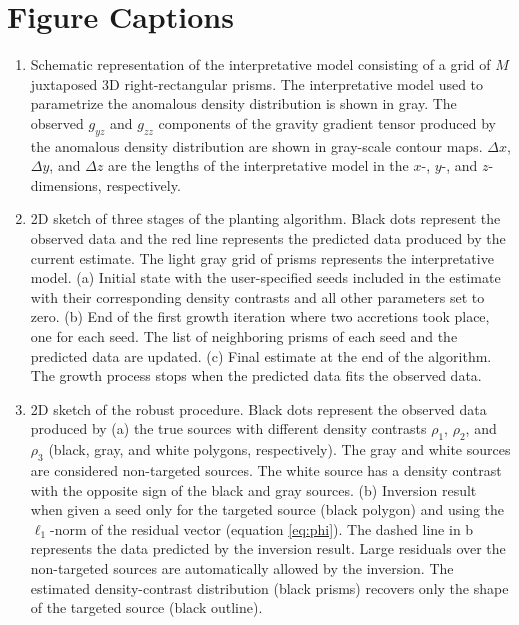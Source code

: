 \newpage
\section{Figure Captions}


\begin{enumerate}

\item \label{fig:interpmodel}
    Schematic representation of the interpretative model
    consisting of a grid of $M$ juxtaposed 3D right-rectangular prisms.
    The interpretative model used to
    parametrize the anomalous density distribution
    is shown in gray.
    The observed $g_{yz}$ and $g_{zz}$ components of
    the gravity gradient tensor produced by
    the anomalous density distribution
    are shown in gray-scale contour maps.
    $\Delta x$, $\Delta y$, and $\Delta z$ are
    the lengths of the interpretative model
    in the $x$-, $y$-, and $z$-dimensions, respectively.

\item \label{fig:sketch}
    2D sketch of three stages of the planting algorithm.
    Black dots represent the observed data and the red line represents the
    predicted data produced by the current estimate.
    The light gray grid of prisms represents the interpretative model.
    (a) Initial state with the user-specified seeds included in the estimate
    with their corresponding density contrasts and all other parameters set to
    zero.
    (b) End of the first growth iteration where two accretions took place,
    one for each seed.
    The list of neighboring prisms of each seed and the predicted data are
    updated. (c) Final estimate at the end of the algorithm.
    The growth process stops when the predicted data fits the observed data.    
    
\item \label{fig:robust}
    2D sketch of the robust procedure.
    Black dots represent the observed data produced by (a) the true sources
    with different density contrasts $\rho_1$, $\rho_2$, and $\rho_3$
    (black, gray, and white polygons, respectively).
    The gray and white sources are considered
    non-targeted sources. The white source has a density contrast with the
    opposite sign of the black and gray sources.
    (b) Inversion result when given a seed only for the targeted source
    (black polygon) and using the $\ell_1$-norm of the residual vector
    (equation \ref{eq:phi}).
    The dashed line in b represents the data predicted by the inversion result.
    Large residuals over the non-targeted sources are automatically
    allowed by the inversion.
    The estimated density-contrast distribution (black prisms) recovers only
    the shape of the targeted source (black outline).


\end{enumerate}
